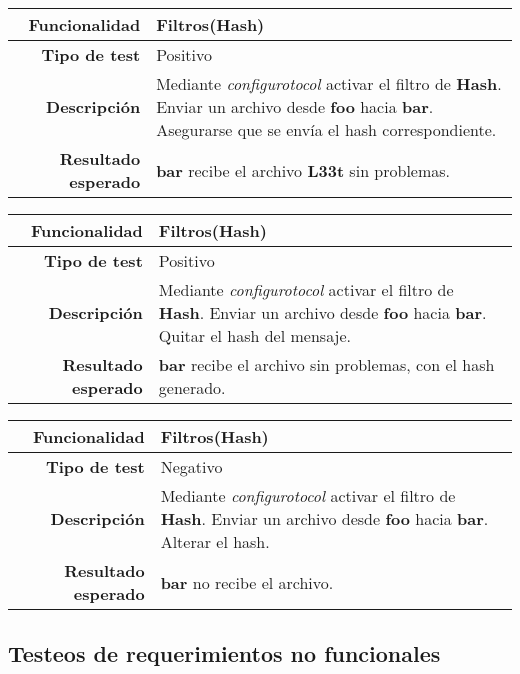 \documentclass[a4paper,10pt]{article}
\begin{document}
\begin{center}
  \begin{tabular}{|r|p{12.5cm}|}
    \hline
    \textbf{Funcionalidad}	&	Filtros(Hash)\\
    \hline
    \textbf{Tipo de test}	&	Positivo\\
    \hline
    \textbf{Descripción}	&	Mediante \textit{configurotocol} activar el filtro de \textbf{Hash}. 
					Enviar un archivo desde \textbf{foo} hacia \textbf{bar}. Asegurarse que 
					se envía el hash correspondiente.\\
    \hline
    \textbf{Resultado esperado}	&	\textbf{bar} recibe el archivo \textbf{L33t} sin problemas.\\
    \hline   
  \end{tabular}
\end{center}

\begin{center}
  \begin{tabular}{|r|p{12.5cm}|}
    \hline
    \textbf{Funcionalidad}	&	Filtros(Hash)\\
    \hline
    \textbf{Tipo de test}	&	Positivo\\
    \hline
    \textbf{Descripción}	&	Mediante \textit{configurotocol} activar el filtro de \textbf{Hash}. 
					Enviar un archivo desde \textbf{foo} hacia \textbf{bar}. Quitar el hash del mensaje.\\
    \hline
    \textbf{Resultado esperado}	&	\textbf{bar} recibe el archivo sin problemas, con el hash generado.\\
    \hline   
  \end{tabular}
\end{center}

\begin{center}
  \begin{tabular}{|r|p{12.5cm}|}
    \hline
    \textbf{Funcionalidad}	&	Filtros(Hash)\\
    \hline
    \textbf{Tipo de test}	&	Negativo\\
    \hline
    \textbf{Descripción}	&	Mediante \textit{configurotocol} activar el filtro de \textbf{Hash}. 
					Enviar un archivo desde \textbf{foo} hacia \textbf{bar}. Alterar el hash.\\
    \hline
    \textbf{Resultado esperado}	&	\textbf{bar} no recibe el archivo.\\
    \hline   
  \end{tabular}
\end{center}

\subsection{Testeos de requerimientos no funcionales}
\end{document}
